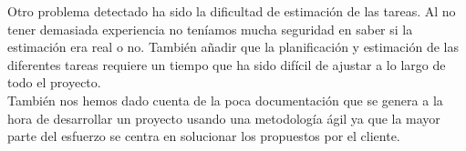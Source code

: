\documentclass[11pt]{article}
\begin{document}
Otro problema detectado ha sido la dificultad de estimación de las tareas. Al no tener demasiada experiencia no teníamos mucha seguridad en saber si la estimación era real o no. También añadir que la planificación y estimación de las diferentes tareas requiere un tiempo que ha sido difícil de ajustar a lo largo de todo el proyecto. \\

También nos hemos dado cuenta de la poca documentación que se genera a la hora de desarrollar un proyecto usando una metodología ágil ya que la mayor parte del esfuerzo se centra en solucionar los propuestos por el cliente.
\end{document}
